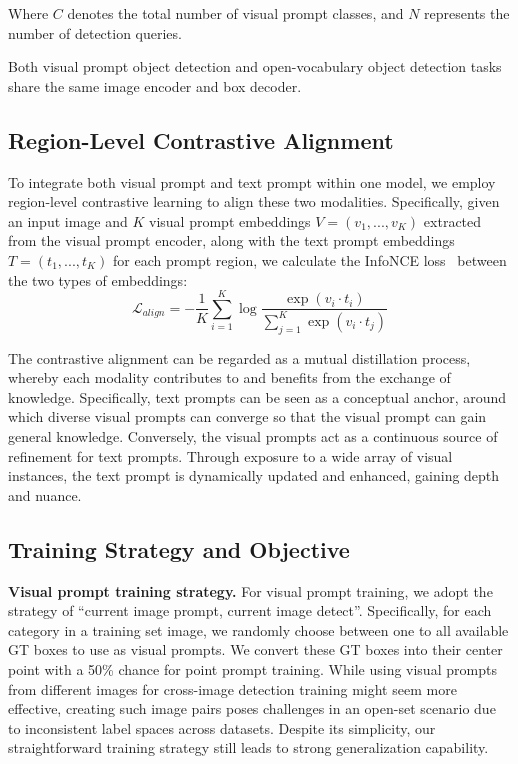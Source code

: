 Where $C$ denotes the total number of visual prompt classes, and $N$ represents the number of detection queries.

Both visual prompt object detection and open-vocabulary object detection tasks share the same image encoder and box decoder.

\subsection{Region-Level Contrastive Alignment}
To integrate both visual prompt and text prompt within one model, we employ region-level contrastive learning to align these two modalities. Specifically, given an input image and $K$ visual prompt embeddings $V=(v_1, ..., v_K)$ extracted from the visual prompt encoder, along with the text prompt embeddings $T=(t_1, ..., t_K)$ for each prompt region, we calculate the InfoNCE loss~\cite{oord2018representation} between the two types of embeddings:
\begin{equation}
    \mathcal{L}_{align} = -\frac{1}{K} \sum_{i=1}^K \log \frac{\exp(v_i \cdot t_i)}{\sum_{j=1}^K \exp(v_i \cdot t_j)}
\end{equation}

The contrastive alignment can be regarded as a mutual distillation process, whereby each modality contributes to and benefits from the exchange of knowledge. Specifically, text prompts can be seen as a conceptual anchor, around which diverse visual prompts can converge so that the visual prompt can gain general knowledge. Conversely, the visual prompts act as a continuous source of refinement for text prompts. Through exposure to a wide array of visual instances, the text prompt is dynamically updated and enhanced, gaining depth and nuance.

\subsection{Training Strategy and Objective}
\textbf{Visual prompt training strategy.} For visual prompt training, we adopt the strategy of ``current image prompt, current image detect''. Specifically, for each category in a training set image, we randomly choose between one to all available GT boxes to use as visual prompts. We convert these GT boxes into their center point with a 50\% chance for point prompt training. While using visual prompts from different images for cross-image detection training might seem more effective, creating such image pairs poses challenges in an open-set scenario due to inconsistent label spaces across datasets. Despite its simplicity, our straightforward training strategy still leads to strong generalization capability.

